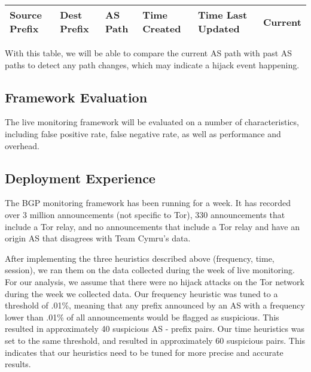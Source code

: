 \begin{itemize}
\begin{center}
\begin{tabular}{ p{8mm} | p{8mm} | p{6mm} | p{1cm} | p{1.1cm} | p{8mm}}
  \hline			
  Source Prefix & Dest Prefix & AS Path & Time Created & Time Last Updated & Current \\
  \hline  
\end{tabular}
\label{tab:pathinfo}
\end{center}
With this table, we will be able to compare the current AS path with past AS paths to detect any path changes, which may indicate a hijack event happening. 

\end{itemize}

\subsection{Framework Evaluation}
The live monitoring framework will be evaluated on a number of characteristics, including false positive rate, false negative rate, as well as performance and overhead.

\subsection{Deployment Experience}
The BGP monitoring framework has been running for a week.  It has recorded over 3 million announcements (not specific to Tor), 330 announcements that include a Tor relay, and no announcements that include a Tor relay and have an origin AS that disagrees with Team Cymru's data.  

After implementing the three heuristics described above (frequency, time, session), we ran them on the data collected during the week of live monitoring.  For our analysis, we assume that there were no hijack attacks on the Tor network during the week we collected data.  Our frequency heuristic was tuned to a threshold of .01\%, meaning that any prefix announced by an AS with a frequency lower than .01\% of all announcements would be flagged as suspicious.  This resulted in approximately 40 suspicious AS - prefix pairs.  Our time heuristics was set to the same threshold, and resulted in approximately 60 suspicious pairs.  This indicates that our heuristics need to be tuned for more precise and accurate results.
